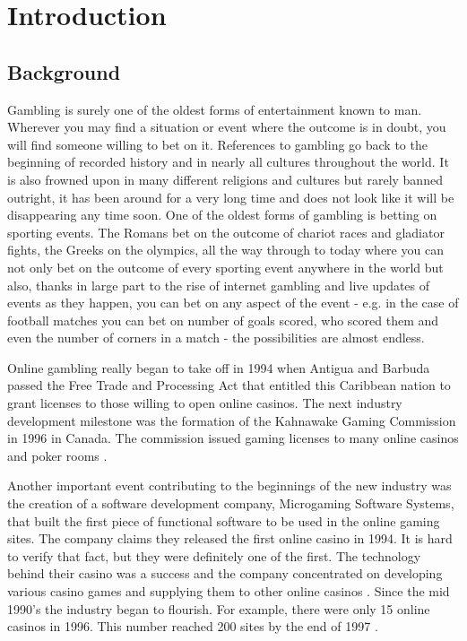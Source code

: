 \chapter{Introduction}
\label{sec:introduction}
\setcounter{page}{1}

\section{Background}
\label{sec:background_intro}
Gambling is surely one of the oldest forms of entertainment known to man. Wherever you may find a situation or event where the outcome is in doubt, you will find someone willing to bet on it. References to gambling go back to the beginning of recorded history and in nearly all cultures throughout the world.  It is also frowned upon in many different religions and cultures but rarely banned outright, it has been around for a very long time and does not look like it will be disappearing any time soon.  One of the oldest forms of gambling is betting on sporting events. The Romans bet on the outcome of chariot races and gladiator fights, the Greeks on the olympics, all the way through to today where you can not only bet on the outcome of every sporting event anywhere in the world but also, thanks in large part to the rise of internet gambling and live updates of events as they happen, you can bet on any aspect of the event - e.g. in the case of football matches you can bet on number of goals scored, who scored them and even the number of corners in a match - the possibilities are almost endless.

Online gambling really began to take off in 1994 when Antigua and Barbuda passed the Free Trade and Processing Act that entitled this Caribbean nation to grant licenses to those willing to open online casinos. The next industry development milestone was the formation of the Kahnawake Gaming Commission in 1996 in Canada. The commission issued gaming licenses to many online casinos and poker rooms \citep{art:historyofonlinegambling}.

Another important event contributing to the beginnings of the new industry was the creation of a software development company, Microgaming Software Systems, that built the first piece of functional software to be used in the online gaming sites. The company claims they released the first online casino in 1994. It is hard to verify that fact, but they were definitely one of the first. The technology behind their casino was a success and the company concentrated on developing various casino games and supplying them to other online casinos \citep{source:microgaming} \citep{source:gamblingsites}. Since the mid 1990's the industry began to flourish. For example, there were only 15 online casinos in 1996. This number reached 200 sites by the end of 1997 \citep{art:historyofonlinegambling}.  

